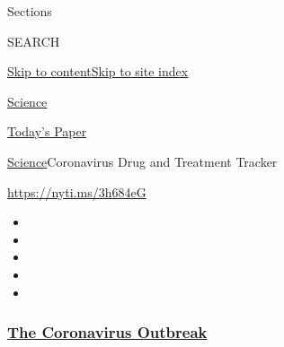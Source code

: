 Sections

SEARCH

\protect\hyperlink{site-content}{Skip to
content}\protect\hyperlink{site-index}{Skip to site index}

\href{https://www.nytimes3xbfgragh.onion/section/science}{Science}

\href{https://myaccount.nytimes3xbfgragh.onion/auth/login?response_type=cookie\&client_id=vi}{}

\href{https://www.nytimes3xbfgragh.onion/section/todayspaper}{Today's
Paper}

\href{/section/science}{Science}\textbar{}Coronavirus Drug and Treatment
Tracker

\url{https://nyti.ms/3h684eG}

\begin{itemize}
\item
\item
\item
\item
\item
\end{itemize}

\hypertarget{the-coronavirus-outbreak}{%
\subsubsection{\texorpdfstring{\href{https://www.nytimes3xbfgragh.onion/news-event/coronavirus?name=styln-coronavirus-national\&region=TOP_BANNER\&block=storyline_menu_recirc\&action=click\&pgtype=Interactive\&impression_id=3f5e15a0-f52f-11ea-9322-a3eb5bc47b4b\&variant=undefined}{The
Coronavirus
Outbreak}}{The Coronavirus Outbreak}}\label{the-coronavirus-outbreak}}

